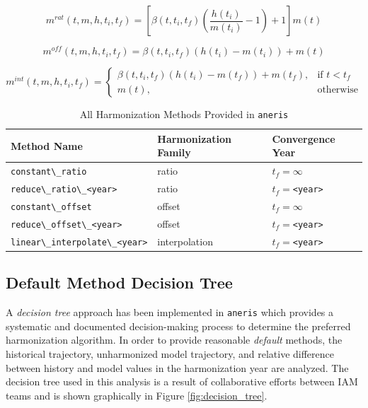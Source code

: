 \documentclass[review]{elsarticle}
\newcommand{\code}[1]{\lstinline[basicstyle=\ttfamily\color{black}]|#1|}
\newcommand{\codeb}[1]{\texttt{#1}}
\begin{document}
\begin{equation}\label{eqs:ratio}
  m^{rat}(t, m, h, t_i, t_f) = [\beta(t, t_i, t_f) (\frac{h(t_i)}{m(t_i)} - 1) + 1] m(t)
\end{equation}

\begin{equation}\label{eqs:offset}
  m^{off}(t, m, h, t_i, t_f) = \beta(t, t_i, t_f) (h(t_i) - m(t_i)) + m(t)
\end{equation}
  
\begin{equation}\label{eqs:interpolate}
  m^{int}(t, m, h, t_i, t_f) =
  \begin{cases}
    \beta(t, t_i, t_f) (h(t_i) - m(t_f)) + m(t_f), & \text{if } t < t_f\\
    m(t), & \text{otherwise}
  \end{cases}
\end{equation}


\begin{table}[h!]
\centering
\caption{All Harmonization Methods Provided in \code{aneris}}
\label{tab:meths}
\begin{tabular}{|l|l|l|}
\hline
Method Name                             & Harmonization Family & Convergence Year\\
\hline
\code{constant\_ratio}                  & ratio              & $t_f = \infty$\\
\code{reduce\_ratio\_<year>}            & ratio              & $t_f = $\code{<year>}\\
\code{constant\_offset}                 & offset             & $t_f = \infty$\\
\code{reduce\_offset\_<year>}           & offset             & $t_f = $\code{<year>}\\
\code{linear\_interpolate\_<year>}      & interpolation      & $t_f = $\code{<year>}\\
\hline
\end{tabular}
\end{table}

\subsection{Default Method Decision Tree}\label{sec:tree}

A \textit{decision tree} approach has been implemented in \codeb{aneris} which
provides a systematic and documented decision-making process to determine the
preferred harmonization algorithm. In order to provide reasonable
\textit{default} methods, the historical trajectory, unharmonized model
trajectory, and relative difference between history and model values in the
harmonization year are analyzed. The decision tree used in this analysis is a
result of collaborative efforts between IAM teams and is shown graphically in
Figure \ref{fig:decision_tree}.
\end{document}
